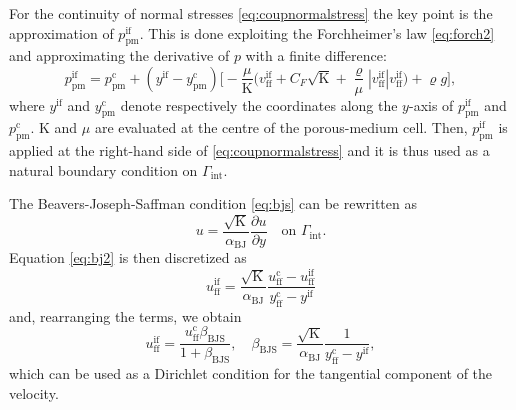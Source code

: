 For the continuity of normal stresses \eqref{eq:coupnormalstress} the key point 
is the approximation of $p_\text{pm}^\text{if}$. This is done exploiting 
the Forchheimer's law \eqref{eq:forch2} and approximating the derivative of $p$ 
with a finite difference:
\begin{equation}
	p_\text{pm}^\text{if} = 
	p_\text{pm}^\text{c}+(y^\text{if}-y_\text{pm}^\text{c}) 
	\Big[-\frac{\mu}{\mathrm{K}}\big(v_\text{ff}^\text{if} 
	+C_F\sqrt{\mathrm{K}}+ 
	\frac{\varrho}{\mu}|v_\text{ff}^\text{if}| 
	v_\text{ff}^\text{if}\big)+\varrho
	 g\Big],
\end{equation}
where $y^\text{if}$ and $y^\text{c}_\text{pm}$ denote respectively the coordinates along the $y$-axis of $p^\text{if}_\text{pm}$ and $p^\text{c}_\text{pm}$.
$\mathrm{K}$ and $\mu$ are evaluated at the centre of the porous-medium cell. 
Then, $p_\text{pm}^\text{if}$ is applied at the right-hand side of 
\eqref{eq:coupnormalstress} and it is thus used as a
natural boundary condition on
$\Gamma_\text{int}$.

The Beavers-Joseph-Saffman condition \eqref{eq:bjs} can be rewritten as
\begin{equation} \label{eq:bj2}
	u = \frac{\sqrt{\mathrm{K}}}{\alpha_\text{BJ}} \frac{\partial u}{\partial 
	y} \quad \text{on $\Gamma_\text{int}$}.
\end{equation}
Equation \eqref{eq:bj2} is then discretized as
\begin{equation} \label{eq:bjsdisc}
	u_\text{ff}^\text{if} = \frac{\sqrt{\mathrm{K}}}{\alpha_\text{BJ}} 
	\frac{u_\text{ff}^\text{c} - 
	u^\text{if}_\text{ff}}{y_\text{ff}^\text{c}-y^\text{if}}
\end{equation}
and, rearranging the terms, we obtain
\begin{equation}
	u_\text{ff}^\text{if} = 	
	\frac{u^\text{c}_\text{ff} \beta_\text{BJS}}{1+\beta_\text{BJS}}, \quad 
	\beta_\text{BJS} = \frac{\sqrt{\mathrm{K}}}{\alpha_\text{BJ}} 
	\frac{1}{y_\text{ff}^\text{c}-y^\text{if}},
\end{equation}
which can be used as a Dirichlet condition for the tangential component of the 
velocity.
%
